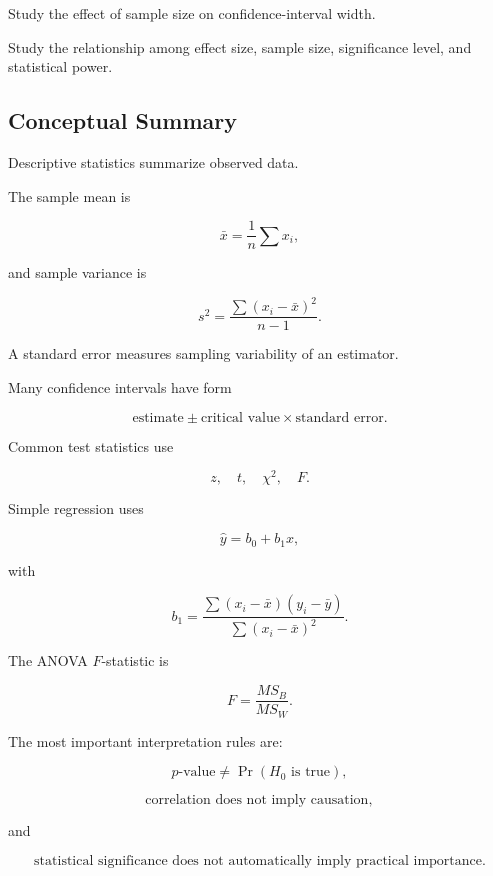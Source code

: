 \begin{exercise}[4]
Study the effect of sample size on confidence-interval width.
\end{exercise}

\begin{exercise}[4]
Study the relationship among effect size, sample size, significance level,
and statistical power.
\end{exercise}

\subsection{Conceptual Summary}
\label{subsec:statistical-tables-summary}

Descriptive statistics summarize observed data.

The sample mean is

\[
\boxed{
\bar{x}
=
\frac1n
\sum x_i,
}
\]

and sample variance is

\[
\boxed{
s^2
=
\frac{
\sum(x_i-\bar{x})^2
}{
n-1
}.
}
\]

A standard error measures sampling variability of an estimator.

Many confidence intervals have form

\[
\boxed{
\text{estimate}
\pm
\text{critical value}
\times
\text{standard error}.
}
\]

Common test statistics use

\[
\boxed{
z,
\quad
t,
\quad
\chi^2,
\quad
F.
}
\]

Simple regression uses

\[
\boxed{
\hat y
=
b_0+b_1x,
}
\]

with

\[
\boxed{
b_1
=
\frac{
\sum(x_i-\bar{x})(y_i-\bar{y})
}{
\sum(x_i-\bar{x})^2
}.
}
\]

The ANOVA \(F\)-statistic is

\[
\boxed{
F
=
\frac{
MS_B
}{
MS_W
}.
}
\]

The most important interpretation rules are:

\[
\boxed{
p\text{-value}
\neq
\Pr(H_0\text{ is true}),
}
\]

\[
\boxed{
\text{correlation does not imply causation},
}
\]

and

\[
\boxed{
\text{statistical significance does not automatically imply practical
importance}.
}
\]

